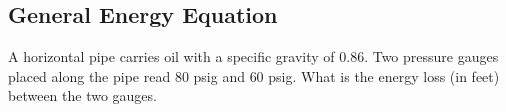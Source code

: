 \documentclass[multi,preview,varwidth=false,border=5,12pt]{standalone}
\begin{document}
\begin{center}
\section*{General Energy Equation}
\end{center}

\begin{question}

A horizontal pipe carries oil with a specific gravity of 0.86.  Two pressure gauges placed along the pipe read 80 psig and 60 psig.  What is the energy loss (in feet) between the two gauges.

\begin{solution}
\end{solution}

\end{question}
\end{document}
